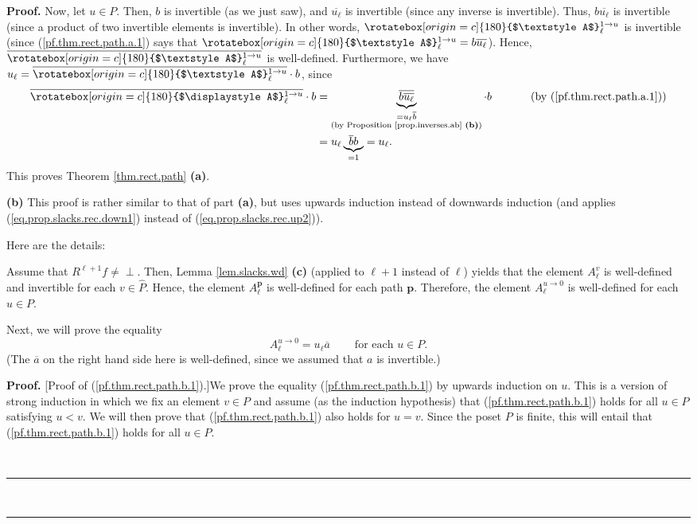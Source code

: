\documentclass[numbers=enddot,12pt,final,onecolumn,notitlepage]{scrartcl}%
\theoremstyle{definition}
\newenvironment{verlong}{}{}
\newcommand{\undf}{\operatorname*{\bot}}
\newcommand{\upslack}{\mathchoice{\rotatebox[origin=c]{180}{$\displaystyle A$}}{\rotatebox[origin=c]{180}{$\textstyle A$}}{\rotatebox[origin=c]{180}{$\scriptstyle A$}}{\rotatebox[origin=c]{180}{$\scriptscriptstyle A$}}}
\newcommand{\downslack}{A}
\newenvironment{proof}[1][Proof]{\noindent\textbf{#1.} }{\ \rule{0.5em}{0.5em}}
\begin{document}
\begin{proof}
\begin{verlong}
Now, let $u\in P$. Then, $b$ is invertible (as we just saw), and
$\overline{u_{\ell}}$ is invertible (since any inverse is invertible). Thus,
$b\overline{u_{\ell}}$ is invertible (since a product of two invertible
elements is invertible). In other words, $\upslack_{\ell}^{1\rightarrow u}$ is
invertible (since (\ref{pf.thm.rect.path.a.1}) says that $\upslack_{\ell
}^{1\rightarrow u}=b\overline{u_{\ell}}$). Hence, $\overline{\upslack_{\ell
}^{1\rightarrow u}}$ is well-defined. Furthermore, we have $u_{\ell}%
=\overline{\upslack_{\ell}^{1\rightarrow u}}\cdot b$, since%
\begin{align*}
\overline{\upslack_{\ell}^{1\rightarrow u}}\cdot b  &  =\underbrace{\overline
{b\overline{u_{\ell}}}}_{\substack{=u_{\ell}\overline{b}\\\text{(by
Proposition \ref{prop.inverses.ab} \textbf{(b)})}}}\cdot
b\ \ \ \ \ \ \ \ \ \ \left(  \text{by (\ref{pf.thm.rect.path.a.1})}\right) \\
&  =u_{\ell}\underbrace{\overline{b}b}_{=1}=u_{\ell}.
\end{align*}
This proves Theorem \ref{thm.rect.path} \textbf{(a)}. \medskip
\end{verlong}

\textbf{(b)} This proof is rather similar to that of part \textbf{(a)}, but
uses upwards induction instead of downwards induction (and applies
(\ref{eq.prop.slacks.rec.down1}) instead of (\ref{eq.prop.slacks.rec.up2})).

\begin{verlong}
Here are the details:

Assume that $R^{\ell+1}f\neq\undf$. Then, Lemma \ref{lem.slacks.wd}
\textbf{(c)} (applied to $\ell+1$ instead of $\ell$) yields that the element
$\downslack_{\ell}^{v}$ is well-defined and invertible for each $v\in
\widehat{P}$. Hence, the element $\downslack_{\ell}^{\mathbf{p}}$ is
well-defined for each path $\mathbf{p}$. Therefore, the element
$\downslack_{\ell}^{u\rightarrow0}$ is well-defined for each $u\in P$.

Next, we will prove the equality
\begin{equation}
\downslack_{\ell}^{u\rightarrow0}=u_{\ell}\overline{a}%
\ \ \ \ \ \ \ \ \ \ \text{for each }u\in P. \label{pf.thm.rect.path.b.1}%
\end{equation}
(The $\overline{a}$ on the right hand side here is well-defined, since we
assumed that $a$ is invertible.)

\begin{proof}
[Proof of (\ref{pf.thm.rect.path.b.1}).]We prove the equality
(\ref{pf.thm.rect.path.b.1}) by upwards induction on $u$. This is a version of
strong induction in which we fix an element $v\in P$ and assume (as the
induction hypothesis) that (\ref{pf.thm.rect.path.b.1}) holds for all $u\in P$
satisfying $u<v$. We will then prove that (\ref{pf.thm.rect.path.b.1}) also
holds for $u=v$. Since the poset $P$ is finite, this will entail that
(\ref{pf.thm.rect.path.b.1}) holds for all $u\in P$.


\end{proof}
\end{verlong}
\end{proof}
\end{document}
